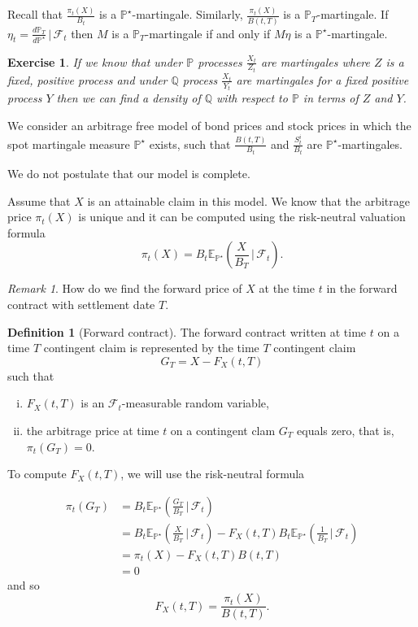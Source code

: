 \documentclass[10pt, oneside, reqno]{amsbook}
\theoremstyle{plain}%
\newtheorem{exer}[thm]{Exercise}
\theoremstyle{definition}
\newtheorem{defn}[thm]{Definition}
\theoremstyle{remark}
\newtheorem*{rem}{Remark}
\newcommand{\given}{ \, | \,}
\newcommand{\sigf}{\mathcal{F}}
\newcommand{\Q}{\mathbb{Q}}
\newcommand{\E}{\mathbb{E}}
\renewcommand{\P}{\mathbb{P}}
\numberwithin{equation}{chapter}
\begin{document}
Recall that $\frac{\pi_t(X)}{B_t}$ is a $\P^\star$-martingale. Similarly, $\frac{\pi_t(X)}{B(t, T)}$ is a $\P_T$-martingale.  If $\eta_t = \frac{d \P_T}{d\P^\star} \given \sigf_t$ then $M$ is a $\P_T$-martingale if and only if $M \eta$ is a $\P^\star$-martingale.  

\begin{exer}
	If we know that under $\P$ processes $\frac{X_t}{Z_t}$ are martingales where $Z$ is a fixed, positive process and under $\Q$ process $\frac{X_t}{Y_t}$ are martingales for a fixed positive process $Y$ then we can find a density of $\Q$ with respect to $\P$ in terms of $Z$ and $Y$. 
\end{exer}


We consider an arbitrage free model of bond prices and stock prices in which the spot martingale measure $\P^\star$ exists, such that $\frac{B(t, T)}{B_t}$ and $\frac{S^i_t}{B_t}$ are $\P^\star$-martingales.

We do not postulate that our model is complete.

Assume that $X$ is an attainable claim in this model.  We know that the arbitrage price $\pi_t(X)$ is unique and it can be computed using the risk-neutral valuation formula \[
	\pi_t(X) = B_t \E_{\P^\star} \left( \frac{X}{B_T} \given \sigf_t \right).
\]

\begin{rem}
	How do we find the forward price of $X$ at the time $t$ in the forward contract with settlement date $T$.
\end{rem}

\begin{defn}[Forward contract]
	The forward contract written at time $t$ on a time $T$ contingent claim is represented by the time $T$ contingent claim \[
		G_T = X - F_X(t, T)
	\] such that \begin{enumerate}[(i)]
		\item $F_X(t, T)$ is an $\sigf_t$-measurable random variable, 
		\item the arbitrage price at time $t$ on a contingent clam $G_T$ equals zero, that is, $\pi_t(G_T) = 0$.
	\end{enumerate}
\end{defn}

To compute $F_X(t, T)$, we will use the risk-neutral formula

\begin{align*}
	\pi_t(G_T) &= B_t \E_{\P^\star} \left( \frac{G_T}{B_T} \given \sigf_t \right) \\
		&= B_t \E_{\P^\star} \left( \frac{X}{B_T} \given \sigf_t \right) - F_X(t, T) B_t \E_{\P^\star} \left(\frac{1}{B_T} \given \sigf_t \right) \\
		&= \pi_t(X) - F_X(t, T) B(t, T) \\
		&= 0
\end{align*} and so \[
	F_X(t, T) = \frac{\pi_t(X)}{B(t, T)}.
\] 
\end{document}
